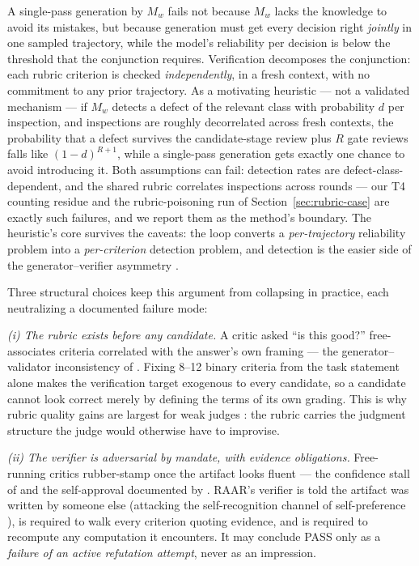 \documentclass[journal]{IEEEtran}
\newcommand{\method}{RAAR}
\begin{document}
A single-pass generation by $M_w$ fails not because $M_w$ lacks the
knowledge to avoid its mistakes, but because generation must get every
decision right \emph{jointly} in one sampled trajectory, while the model's
reliability per decision is below the threshold that the conjunction
requires. Verification decomposes the conjunction: each rubric criterion is
checked \emph{independently}, in a fresh context, with no commitment to any
prior trajectory. As a motivating heuristic --- not a validated mechanism
--- if $M_w$ detects a defect of the relevant class with probability $d$
per inspection, and inspections are roughly decorrelated across fresh
contexts, the probability that a defect survives the candidate-stage
review plus $R$ gate reviews falls like $(1-d)^{R+1}$, while a single-pass
generation gets exactly one chance to avoid introducing it. Both
assumptions can fail: detection rates are defect-class-dependent, and the
shared rubric correlates inspections across rounds --- our T4 counting
residue and the rubric-poisoning run of Section~\ref{sec:rubric-case} are
exactly such failures, and we report them as the method's boundary. The
heuristic's core survives the caveats: the loop converts a
\emph{per-trajectory} reliability problem into a \emph{per-criterion}
detection problem, and detection is the easier side of the
generator--verifier asymmetry \cite{cobbe2021, setlur2025, weiblog2025}.

Three structural choices keep this argument from collapsing in practice,
each neutralizing a documented failure mode:

\emph{(i) The rubric exists before any candidate.} A critic asked ``is this
good?'' free-associates criteria correlated with the answer's own framing
--- the generator--validator inconsistency of \cite{li2023gv}. Fixing 8--12
binary criteria from the task statement alone makes the verification target
exogenous to every candidate, so a candidate cannot look correct merely by
defining the terms of its own grading. This is why rubric quality gains are
largest for weak judges \cite{rar2025}: the rubric carries the judgment
structure the judge would otherwise have to improvise.

\emph{(ii) The verifier is adversarial by mandate, with evidence
obligations.} Free-running critics rubber-stamp once the artifact looks
fluent --- the confidence stall of \cite{liang2023} and the self-approval
documented by \cite{huang2023}. \method{}'s verifier is told the artifact
was written by someone else (attacking the self-recognition channel of
self-preference \cite{panickssery2024}), is required to walk every
criterion quoting evidence, and is required to recompute any computation it
encounters. It may conclude PASS only as a \emph{failure of an active
refutation attempt}, never as an impression.
\end{document}
